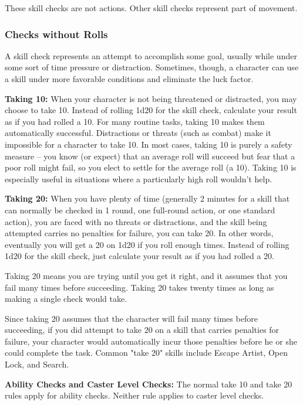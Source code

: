These skill checks are not actions. Other skill checks represent part of movement.

\subsubsection{Checks without Rolls}

A skill check represents an attempt to accomplish some goal, usually while under 
some sort of time pressure or distraction. Sometimes, though, a character can use 
a skill under more favorable conditions and eliminate the luck factor.

\textbf{Taking 10:} When your character is not being threatened or distracted, 
you may choose to take 10. Instead of rolling 1d20 for the skill check, calculate 
your result as if you had rolled a 10. For many routine tasks, taking 10 makes 
them automatically successful. Distractions or threats (such as combat) make it 
impossible for a character to take 10. In most cases, taking 10 is purely a safety 
measure -- you know (or expect) that an average roll will succeed but fear that 
a poor roll might fail, so you elect to settle for the average roll (a 10). Taking 
10 is especially useful in situations where a particularly high roll wouldn't help.

\textbf{Taking 20:} When you have plenty of time (generally 2 minutes for a skill 
that can normally be checked in 1 round, one full-round action, or one standard 
action), you are faced with no threats or distractions, and the skill being attempted 
carries no penalties for failure, you can take 20. In other words, eventually you 
will get a 20 on 1d20 if you roll enough times. Instead of rolling 1d20 for the 
skill check, just calculate your result as if you had rolled a 20.

Taking 20 means you are trying until you get it right, and it assumes that you 
fail many times before succeeding. Taking 20 takes twenty times as long as making 
a single check would take.

Since taking 20 assumes that the character will fail many times before succeeding, 
if you did attempt to take 20 on a skill that carries penalties for failure, your 
character would automatically incur those penalties before he or she could complete 
the task. Common "take 20" skills include Escape Artist, Open Lock, and Search.

\textbf{Ability Checks and Caster Level Checks:} The normal take 10 and take 20 
rules apply for ability checks. Neither rule applies to caster level checks.

